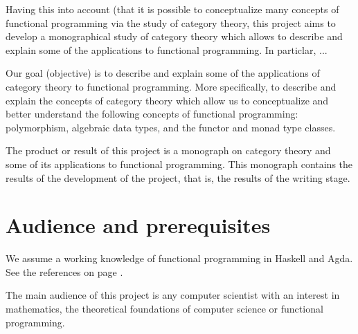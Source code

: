 Having this into account (that it is possible to conceptualize many
concepts of functional programming via the study of category theory,
this project aims to develop a monographical study of category theory
which allows to describe and explain some of the applications to
functional programming. In particlar, ...

Our goal (objective) is to describe and explain some of the
applications of category theory to functional programming. More
specifically, to describe and explain the concepts of category theory
which allow us to conceptualize and better understand the following
concepts of functional programming: polymorphism, algebraic data
types, and the functor and monad type classes.

The product or result of this project is a monograph on category
theory and some of its applications to functional programming. This
monograph contains the results of the development of the project, that
is, the results of the writing stage.

\section*{Audience and prerequisites}
\label{sec:introduction-prerequisites}

We assume a working knowledge of functional programming in Haskell and
Agda. See the references on page
\pageref{sec:introduction-references}.


The main audience of this project is any computer scientist with an
interest in mathematics, the theoretical foundations of computer
science or functional programming.





